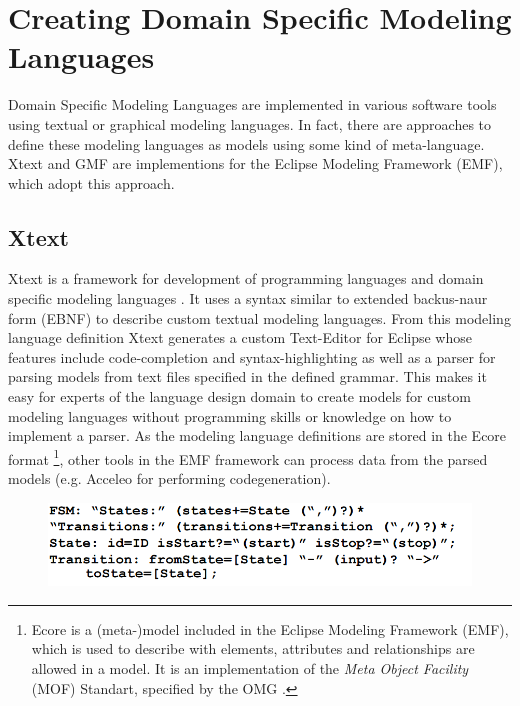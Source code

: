 \documentclass[runningheads,a4paper]{llncs}
\begin{document}

    
    \newpage
    \section{Creating Domain Specific Modeling Languages}
    Domain Specific Modeling Languages are implemented in various software tools using textual or graphical modeling languages.
    In fact, there are approaches to define these modeling languages as models using some kind of meta-language.
    Xtext and GMF are implementions for the Eclipse Modeling Framework (EMF), which adopt this approach.
    
    \subsection{Xtext}
    Xtext is a framework for development of programming languages and domain specific modeling languages \cite{eysholdt2010xtext}.
    It uses a syntax similar to extended backus-naur form (EBNF) to describe custom textual modeling languages. 
    From this modeling language definition Xtext generates a custom Text-Editor for Eclipse whose features include code-completion and syntax-highlighting
    as well as a parser for parsing models from text files specified in the defined grammar. This makes it easy for experts of the language design
    domain to create models for custom modeling languages without programming skills or knowledge on how to implement a parser.
    As the modeling language definitions are stored in the Ecore format \footnote{Ecore is a (meta-)model included in the Eclipse Modeling Framework (EMF), which is used to describe with elements, attributes and relationships are allowed 
    in a model. It is an implementation of the \emph{Meta Object Facility} (MOF) Standart, specified by the OMG \cite{mof20062}.}, other tools in the EMF framework can process data from the parsed 
    models (e.g. Acceleo\cite{musset2006acceleo} for performing codegeneration).  
    
    \begin{figure}[H]
      \centering
      \includegraphics[width=\textwidth]{images/XTextGrammar.PNG}
    \end{figure}
   
\end{document}
